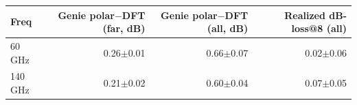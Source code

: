 \begin{tabular}{lrrr}
\toprule
Freq & Genie polar$-$DFT (far, dB) & Genie polar$-$DFT (all, dB) & Realized dB-loss@8 (all) \\
\midrule
60 GHz & 0.26$\pm$0.01 & 0.66$\pm$0.07 & 0.02$\pm$0.06 \\
140 GHz & 0.21$\pm$0.02 & 0.60$\pm$0.04 & 0.07$\pm$0.05 \\
\bottomrule
\end{tabular}
